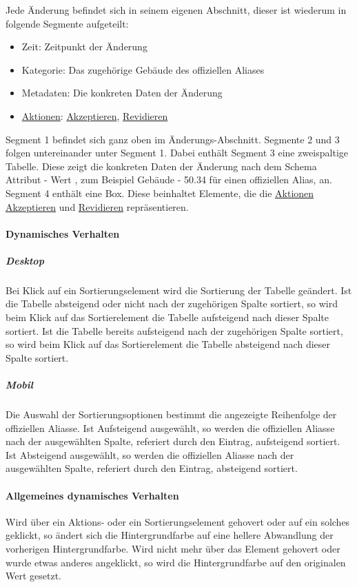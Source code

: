 Jede Änderung befindet sich in seinem eigenen Abschnitt, dieser ist wiederum in folgende Segmente aufgeteilt:

\begin{itemize}
    \item Zeit: Zeitpunkt der Änderung
    \item Kategorie: Das zugehörige Gebäude des offiziellen Aliases
    \item Metadaten: Die konkreten Daten der Änderung
    \item \hyperref[AP_Aktionen_Anderungen]{Aktionen}: \hyperref[AP_Aktionen_Anderungen_Akzeptieren]{Akzeptieren}, \hyperref[AP_Aktionen_Anderungen_Revidieren]{Revidieren}
\end{itemize}

Segment 1 befindet sich ganz oben im Änderungs-Abschnitt. Segmente 2 und 3 folgen untereinander unter Segment 1.
Dabei enthält Segment 3 eine zweispaltige Tabelle. Diese zeigt die konkreten Daten der Änderung nach dem Schema \dq Attribut - Wert \dq{}, zum Beispiel \dq Gebäude - 50.34 \dq{} für einen offiziellen Alias, an.
Segment 4 enthält eine Box. Diese beinhaltet Elemente, die die \hyperref[AP_Aktionen_Anderungen]{Aktionen} \hyperref[AP_Aktionen_Anderungen_Akzeptieren]{Akzeptieren} und \hyperref[AP_Aktionen_Anderungen_Revidieren]{Revidieren} repräsentieren.

\paragraph*{Dynamisches Verhalten}
\subparagraph*{Desktop}
Bei Klick auf ein Sortierungselement wird die Sortierung der Tabelle geändert.
Ist die Tabelle absteigend oder nicht nach der zugehörigen Spalte sortiert, so wird beim Klick auf das Sortierelement die Tabelle aufsteigend nach dieser Spalte sortiert.
Ist die Tabelle bereits aufsteigend nach der zugehörigen Spalte sortiert, so wird beim Klick auf das Sortierelement die Tabelle absteigend nach dieser Spalte sortiert.

\subparagraph*{Mobil}
Die Auswahl der Sortierungsoptionen bestimmt die angezeigte Reihenfolge der offiziellen Aliasse.
Ist \dq Aufsteigend \dq{} ausgewählt, so werden die offiziellen Aliasse nach der ausgewählten Spalte, referiert durch den Eintrag, aufsteigend sortiert.
Ist \dq Absteigend \dq{} ausgewählt, so werden die offiziellen Aliasse nach der ausgewählten Spalte, referiert durch den Eintrag, absteigend sortiert.

\paragraph*{Allgemeines dynamisches Verhalten}
Wird über ein Aktions- oder ein Sortierungselement gehovert oder auf ein solches geklickt, so ändert sich die Hintergrundfarbe auf eine hellere Abwandlung der vorherigen Hintergrundfarbe.
Wird nicht mehr über das Element gehovert oder wurde etwas anderes angeklickt, so wird die Hintergrundfarbe auf den originalen Wert gesetzt.

